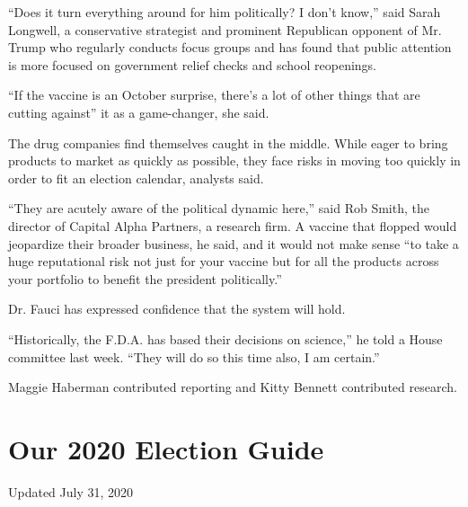 ``Does it turn everything around for him politically? I don't know,''
said Sarah Longwell, a conservative strategist and prominent Republican
opponent of Mr. Trump who regularly conducts focus groups and has found
that public attention is more focused on government relief checks and
school reopenings.

``If the vaccine is an October surprise, there's a lot of other things
that are cutting against'' it as a game-changer, she said.

The drug companies find themselves caught in the middle. While eager to
bring products to market as quickly as possible, they face risks in
moving too quickly in order to fit an election calendar, analysts said.

``They are acutely aware of the political dynamic here,'' said Rob
Smith, the director of Capital Alpha Partners, a research firm. A
vaccine that flopped would jeopardize their broader business, he said,
and it would not make sense ``to take a huge reputational risk not just
for your vaccine but for all the products across your portfolio to
benefit the president politically.''

Dr. Fauci has expressed confidence that the system will hold.

``Historically, the F.D.A. has based their decisions on science,'' he
told a House committee last week. ``They will do so this time also, I am
certain.''

Maggie Haberman contributed reporting and Kitty Bennett contributed
research.

\hypertarget{our-2020-election-guide}{%
\section{Our 2020 Election Guide}\label{our-2020-election-guide}}

Updated July 31, 2020

